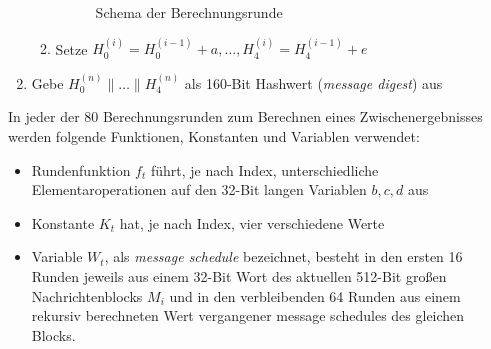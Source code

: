 \begin{enumerate}
\begin{enumerate}
\begin{figure}[h]
			\caption{Schema der Berechnungsrunde}
		\end{figure}
		\item Setze $H_0^{(i)} = H_0^{(i-1)} + a, \dots, H_4^{(i)} = H_4^{(i-1)} + e$
	\end{enumerate}
	\item Gebe $H_0^{(n)} \mathbin{\|} \dots \mathbin{\|} H_4^{(n)}$ als 160-Bit Hashwert (\textit{message digest}) aus
\end{enumerate} 

In jeder der 80 Berechnungsrunden zum Berechnen eines Zwischenergebnisses werden folgende Funktionen, Konstanten und Variablen verwendet:
\begin{itemize}
	\item Rundenfunktion $f_t$ führt, je nach Index, unterschiedliche Elementaroperationen auf den 32-Bit langen Variablen $b, c, d$ aus
	\item Konstante $K_t$ hat, je nach Index, vier verschiedene Werte
	\item Variable $W_t$, als \textit{message schedule} bezeichnet, besteht in den ersten 16 Runden jeweils aus einem 32-Bit Wort des aktuellen 512-Bit großen Nachrichtenblocks $M_i$ und in den verbleibenden 64 Runden aus einem rekursiv berechneten Wert vergangener message schedules des gleichen Blocks.
\end{itemize}

